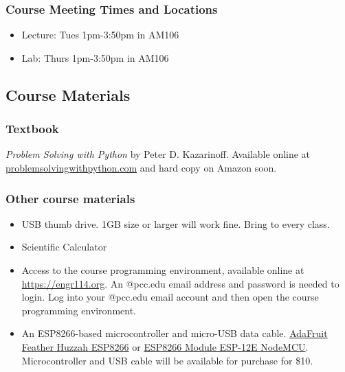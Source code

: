 \documentclass[11pt]{article}
\providecommand{\tightlist}{%
      \setlength{\itemsep}{0pt}\setlength{\parskip}{0pt}}
\begin{document}
\hypertarget{course-meeting-times-and-locations}{%
\subsubsection{Course Meeting Times and
Locations}\label{course-meeting-times-and-locations}}

\begin{itemize}
\tightlist
\item
  Lecture: Tues 1pm-3:50pm in AM106
\item
  Lab: Thurs 1pm-3:50pm in AM106
\end{itemize}

\hypertarget{course-materials}{%
\subsection{Course Materials}\label{course-materials}}

\hypertarget{textbook}{%
\subsubsection{Textbook}\label{textbook}}

\emph{Problem Solving with Python} by Peter D. Kazarinoff. Available
online at
\href{https://problemsolvingwithpython.com/}{problemsolvingwithpython.com}
and hard copy on Amazon soon.

\hypertarget{other-course-materials}{%
\subsubsection{Other course materials}\label{other-course-materials}}

\begin{itemize}
\tightlist
\item
  USB thumb drive. 1GB size or larger will work fine. Bring to every
  class.
\item
  Scientific Calculator
\item
  Access to the course programming environment, available online at
  \url{https://engr114.org}. An @pcc.edu email address and password is
  needed to login. Log into your @pcc.edu email account and then open
  the course programming environment.
\item
  An ESP8266-based microcontroller and micro-USB data cable.
  \href{https://www.adafruit.com/product/3046}{AdaFruit Feather Huzzah
  ESP8266} or \href{http://a.co/d/jh5yMHa}{ESP8266 Module ESP-12E
  NodeMCU}. Microcontroller and USB cable will be available for purchase
  for \$10.
\end{itemize}
\end{document}
